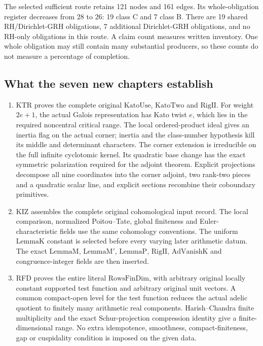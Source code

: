 \documentclass[11pt,a4paper]{article}
\numberwithin{equation}{section}
\theoremstyle{remark}\newtheorem{remark}[theorem]{Remark}
\begin{document}
The selected sufficient route retains 121 nodes and 161 edges.
Its whole-obligation register decreases from 28 to 26:
19 class C and 7 class B. There are 19 shared RH/Dirichlet-GRH
obligations, 7 additional Dirichlet-GRH obligations, and no
RH-only obligations in this route. A claim count measures written
inventory. One whole obligation may still contain many substantial
producers, so these counts do not measure a percentage of completion.

\subsection{What the seven new chapters establish}

\begin{enumerate}
\item KTR proves the complete original \(\mathrm{KatoUse}\),
\(\mathrm{KatoTwo}\) and \(\mathrm{RigII}\). For weight
\(2e+1\), the actual Galois representation has Kato twist \(e\),
which lies in the required noncentral critical range. The local
ordered-product ideal gives an inertia flag on the actual corner;
inertia and the class-number hypothesis kill its middle and determinant
characters. The corner extension is irreducible on the full infinite
cyclotomic kernel. Its quadratic base change has the exact symmetric
polarization required for the adjoint theorem. Explicit projections
decompose all nine coordinates into the corner adjoint, two rank-two
pieces and a quadratic scalar line, and explicit sections recombine
their coboundary primitives.

\item KIZ assembles the complete original cohomological input record.
The local comparison, normalized Poitou--Tate, global finiteness and
Euler-characteristic fields use the same cohomology conventions.
The uniform \(\mathrm{LemmaK}\) constant is selected before every
varying later arithmetic datum. The exact \(\mathrm{LemmaM}\),
\(\mathrm{LemmaM'}\), \(\mathrm{LemmaP}\), \(\mathrm{RigII}\),
\(\mathrm{AdVanishK}\) and congruence-integer fields are then inserted.

\item RFD proves the entire literal \(\mathrm{RowsFinDim}\), with
arbitrary original locally constant supported test function and
arbitrary original unit vectors. A common compact-open level for the
test function reduces the actual adelic quotient to finitely many
arithmetic real components. Harish--Chandra finite multiplicity and
the exact Schur-projection compression identity give a finite-dimensional
range. No extra idempotence, smoothness, compact-finiteness, gap or
cuspidality condition is imposed on the given data.


\end{enumerate}
\end{document}
